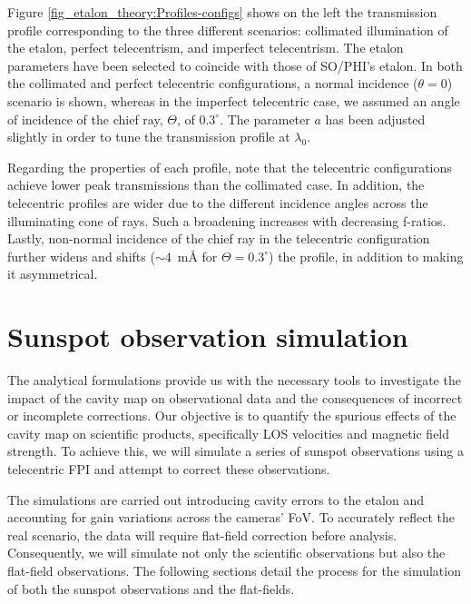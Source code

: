 Figure \ref{fig_etalon_theory:Profiles-configs} shows on the left the transmission profile corresponding to the three different scenarios: collimated illumination of the etalon, perfect telecentrism, and imperfect telecentrism. The etalon parameters have been selected to coincide with those of SO/PHI's etalon. In both the collimated and perfect telecentric configurations, a normal incidence  ($\theta = 0$) scenario is shown, whereas in the imperfect telecentric case, we assumed an angle of incidence of the chief ray, $\Theta$, of $0.3^{\circ}$. The parameter $a$ has been adjusted slightly in order to tune the transmission profile at $\lambda _ 0$. 

Regarding the properties of each profile, note that the telecentric configurations achieve lower peak transmissions than the collimated case. In addition, the telecentric profiles are wider due to the different incidence angles across the illuminating cone of rays. Such a broadening increases with decreasing f-ratios. Lastly, non-normal incidence of the chief ray in the telecentric configuration further widens and shifts ($\sim 4$~m\r{A} for $\Theta=0.3^\circ$) the profile, in addition to making it asymmetrical. 

\section{\label{sect: Mancha_obs}Sunspot observation simulation}

The analytical formulations provide us with the necessary tools to investigate the impact of the cavity map on observational data and the consequences of incorrect or incomplete corrections. Our objective is to quantify the spurious effects of the cavity map on scientific products, specifically LOS velocities and magnetic field strength. To achieve this, we will simulate a series of sunspot observations using a telecentric FPI and attempt to correct these observations.

The simulations are carried out introducing cavity errors to the etalon and accounting for gain variations across the cameras' FoV. To accurately reflect the real scenario, the data will require flat-field correction before analysis. Consequently, we will simulate not only the scientific observations but also the flat-field observations. The following sections detail the process for the simulation of both the sunspot observations and the flat-fields.

